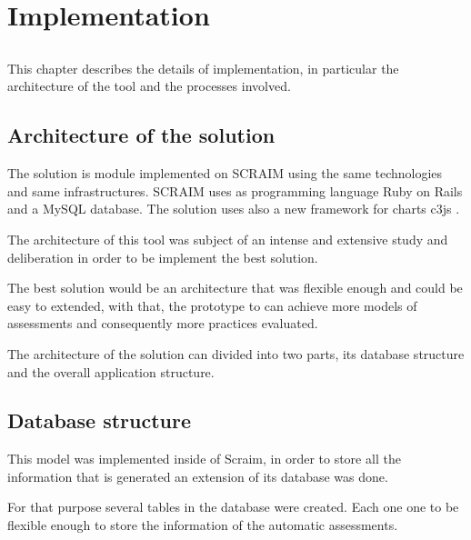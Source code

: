 \chapter{Implementation} \label{chap:implementation}

\section*{}

This chapter describes the details of implementation, in particular the architecture of the tool and the processes involved.

\section{Architecture of the solution} \label{sec:evaluation}

The solution is module implemented on SCRAIM using the same technologies and same infrastructures. SCRAIM uses as programming language Ruby on Rails \citep{hansson2009ruby} and a MySQL \citep{MySql} database. The solution uses also a new framework for charts c3js \citep{c3js}.

The architecture of this tool was subject of an intense and extensive study and deliberation in order to be implement the best solution.

The best solution would be an architecture that was flexible enough and could be easy to extended, with that, the prototype to can achieve more models of assessments and consequently more practices evaluated.

The architecture of the solution can divided into two parts, its database structure and the overall application structure.



\section{Database structure}\label{database}

This model was implemented inside of Scraim, in order to store all the information that is generated an extension of its database was done.

For that purpose several tables in the database were created. Each one one to be flexible enough to store the information of the automatic assessments.


